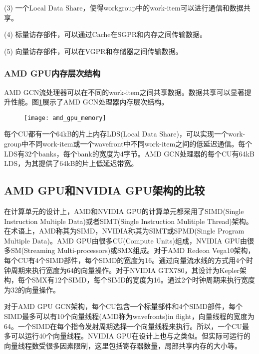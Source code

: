 (3) 一个Local Data Share，使得workgroup中的work-item可以进行通信和数据共享。

(4) 标量访存部件，可以通过Cache在SGPR和内存之间传输数据。

(5) 向量访存部件，可以在VGPR和存储器之间传输数据。

\subsubsection{AMD GPU内存层次结构}
AMD GCN流处理器可以在不同的work-item之间共享数据。数据共享可以显著提升性能。图\ref{fig:amd_gpu_memory}展示了AMD GCN处理器内存层次结构。
\begin{figure}[htbp]
	\centering
	\texttt{[image: amd\_gpu\_memory]}
	\label{fig:amd_gpu_memory}
\end{figure}
每个CU都有一个64kB的片上内存LDS(Local Data Share)，可以实现一个work-group中不同work-item或一个wavefront中不同work-item之间的低延迟通信。每个LDS有32个banks，每个bank的宽度为4字节。AMD GCN处理器的每个CU有64kB LDS，为其提供了64kB的片上低延迟带宽。


\subsection{AMD GPU和NVIDIA GPU架构的比较}
在计算单元的设计上，AMD和NVIDIA GPU的计算单元都采用了SIMD(Single Instruction Multiple Data)或者SIMT(Single Instruction Mulitiple Thread)架构。在术语上，AMD称其为SIMD，NVIDIA称其为SIMT或SPMD(Single Program Multiple Data)。AMD GPU由很多CU(Compute Units)组成，NVIDIA GPU由很多SM(Streaming Multi-processors)或SMX组成。对于AMD Redeon Vega10架构，每个CU有4个SIMD部件，每个SIMD的宽度为16。通过向量流水线的方式用4个时钟周期来执行宽度为64的向量操作。对于NVIDIA GTX780，其设计为Kepler架构，每个SMX有12个SIMD，每个SIMD的宽度为16。通过2个时钟周期来执行宽度为32的向量操作。

对于AMD GPU GCN架构，每个CU包含一个标量部件和4个SIMD部件，每个SIMD最多可以有10个向量线程(AMD称为wavefronts)in flight，向量线程的宽度为64。一个SIMD在每个指令发射周期选择一个向量线程来执行。所以，一个CU最多可以运行40个向量线程。NVIDIA GPU在设计上也与之类似。但实际可运行的向量线程数受很多因素限制，这里包括寄存器数量，局部共享内存的大小等。

